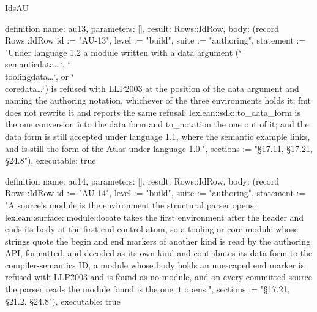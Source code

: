 \begin{lexlean}{IdsAU}
\begin{semanticmodule}
definition{
  name: au13,
  parameters: [],
  result: Rows::IdRow,
  body: (record Rows::IdRow {id := "AU-13", level := "build", suite := "authoring", statement := "Under language 1.2 a module written with a data argument (`\\semanticdata{…}`, `\\toolingdata{…}`, or `\\coredata{…}`) is refused with LLP2003 at the position of the data argument and naming the authoring notation, whichever of the three environments holds it; fmt does not rewrite it and reports the same refusal; lexlean::sdk::to_data_form is the one conversion into the data form and to_notation the one out of it; and the data form is still accepted under language 1.1, where the semantic example links, and is still the form of the Atlas under language 1.0.", sections := "§17.11, §17.21, §24.8"}),
  executable: true
}

definition{
  name: au14,
  parameters: [],
  result: Rows::IdRow,
  body: (record Rows::IdRow {id := "AU-14", level := "build", suite := "authoring", statement := "A source's module is the environment the structural parser opens: lexlean::surface::module::locate takes the first environment after the header and ends its body at the first end control atom, so a tooling or core module whose strings quote the begin and end markers of another kind is read by the authoring API, formatted, and decoded as its own kind and contributes its data form to the compiler-semantics ID, a module whose body holds an unescaped end marker is refused with LLP2003 and is found as no module, and on every committed source the parser reads the module found is the one it opens.", sections := "§17.21, §21.2, §24.8"}),
  executable: true
}
\end{semanticmodule}
\end{lexlean}
